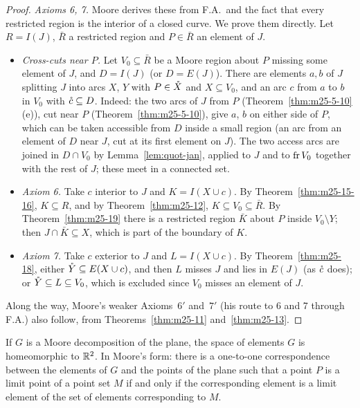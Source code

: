 \begin{proof}
\emph{Axioms 6, 7.} Moore derives these from F.A.\ and the fact that every restricted region is the interior of a
closed curve. We prove them directly. Let $R=I(J)$, $\bar R$ a restricted region and $P\in\bar R$ an element of $J$.
\begin{itemize}
\item \emph{Cross-cuts near $P$.} Let $V_0\subseteq\bar R$ be a Moore region about $P$ missing some element of $J$, and
$D=I(J)$ (or $D=E(J)$). There are elements $a,b$ of $J$ splitting $J$ into arcs $X$, $Y$ with $P\in\mathring{X}$ and
$X\subseteq V_0$, and an arc $c$ from $a$ to $b$ in $V_0$ with $\mathring{c}\subseteq D$. Indeed: the two arcs of $J$ from $P$
(Theorem~\ref{thm:m25-5-10}(e)), cut near $P$ (Theorem~\ref{thm:m25-5-10}), give $a$, $b$ on either side of $P$, which
can be taken accessible from $D$ inside a small region (an arc from an element of $D$ near $J$, cut at its first
element on $J$). The two access arcs are joined in $D\cap V_0$ by Lemma~\ref{lem:quot-jan}, applied to $J$ and to
$\operatorname{fr} V_0$ together with the rest of $J$; these meet in a connected set.
\item \emph{Axiom 6.} Take $c$ interior to $J$ and $K=I(X\cup c)$. By Theorem~\ref{thm:m25-15-16}, $K\subseteq R$, and by
Theorem~\ref{thm:m25-12}, $K\subseteq V_0\subseteq\bar R$. By Theorem~\ref{thm:m25-19} there is a restricted region $\bar K$
about $P$ inside $V_0\setminus Y$; then $J\cap\bar K\subseteq X$, which is part of the boundary of $K$.
\item \emph{Axiom 7.} Take $c$ exterior to $J$ and $L=I(X\cup c)$. By Theorem~\ref{thm:m25-18}, either $\mathring{Y}\subseteq
E(X\cup c)$, and then $L$ misses $J$ and lies in $E(J)$ (as $\mathring{c}$ does); or $\mathring{Y}\subseteq L\subseteq V_0$, which is
excluded since $V_0$ misses an element of $J$.
\end{itemize}
Along the way, Moore's weaker Axioms~$6'$ and~$7'$ (his route to 6 and 7 through F.A.) also follow, from
Theorems~\ref{thm:m25-11} and~\ref{thm:m25-13}.
\end{proof}


\begin{theorem}\label{thm:m25-22}
If $G$ is a Moore decomposition of the plane, the space of elements $G$ is homeomorphic to $\mathbb{R}^2$. In Moore's form:
there is a one-to-one correspondence between the elements of $G$ and the points of the plane such that a point $P$ is
a limit point of a point set $M$ if and only if the corresponding element is a limit element of the set of
elements corresponding to $M$.
\end{theorem}

